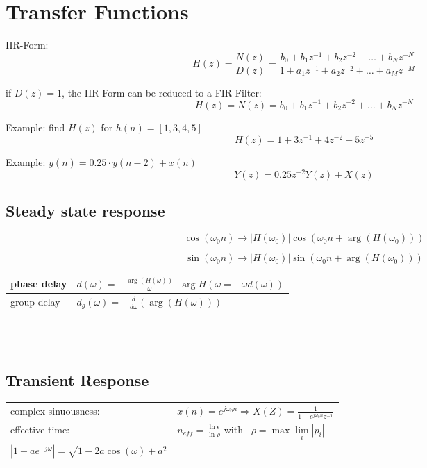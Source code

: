 \section{Transfer Functions}

IIR-Form:
\[ 
	H(z) = \frac{N(z)}{D(z)}
		= \frac{b_0 + b_1 z^{-1} + b_2 z^{-2} + \ldots + b_N z^{-N}}{1 + a_1 z^{-1} + a_2 z^{-2} + \ldots + a_M z^{-M} }
\]

if $D(z) = 1$, the IIR Form can be reduced to a FIR Filter:
\[
	H(z) = N(z) = b_0 + b_1 z^{-1} + b_2 z^{-2} + \ldots + b_N z^{-N}
\]

Example: find $H(z)$ for $h(n) = \left[1,3,4,5\right]$
\[ H(z) = 1 + 3z^{-1} + 4z^{-2} + 5z^{-5}\]

Example: $y(n) = 0.25 \cdot y(n-2) + x(n) $
\[
	Y(z) = 0.25z^{-2}Y(z) + X(z)
\]

\subsection{Steady state response}
\[\cos(\omega_0 n) \rightarrow \left|H(\omega_0) \right| \cos(\omega_0 n + \arg(H(\omega_0))) \]

\[\sin(\omega_0 n) \rightarrow \left|H(\omega_0) \right| \sin(\omega_0 n + \arg(H(\omega_0))) \]

\begin{tabularx}{0.6\textwidth}{|l|X|}
	\hline
	phase delay & $d(\omega) = - \frac{\arg(H(\omega))}{\omega}$\ \qquad $\arg H(\omega = -\omega d(\omega))$
	\\ \hline 
	group delay & $d_g(\omega) = -\frac{d}{d\omega}(\arg(H(\omega)))$	
	\\ \hline
\end{tabularx}\\ \\

\subsection{Transient Response}
\begin{tabularx}{1\textwidth}{l X}
	complex sinuousness: & $x(n) = e^{j \omega_0 n} \Rightarrow X(Z) = \frac{1}{1-e^{j \omega_0 n} z^{-1}} $
	\\ 
	effective time: & $n_{eff} = \frac{\ln \epsilon}{\ln \rho}$ \qquad with \qquad \
	$\rho = \max\lim\limits_{i}\left|p_i \right|$
	\\ 
	$\left| 1-a e^{-j\omega}\right| = \sqrt{1-2a\cos(\omega) + a^2}$
\end{tabularx}\\ \\

